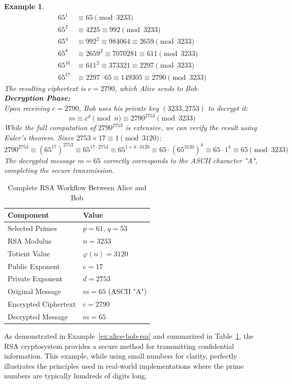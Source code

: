 \documentclass[11pt,a4paper]{article}
\newtheorem{example}{Example}
\numberwithin{equation}{section}
\begin{document}
\begin{example}
\begin{align*}
65^1 &\equiv 65 \pmod{3233} \\
65^2 &\equiv 4225 \equiv 992 \pmod{3233} \\
65^4 &\equiv 992^2 \equiv 984064 \equiv 2659 \pmod{3233} \\
65^8 &\equiv 2659^2 \equiv 7070281 \equiv 611 \pmod{3233} \\
65^{16} &\equiv 611^2 \equiv 373321 \equiv 2297 \pmod{3233} \\
65^{17} &\equiv 2297 \cdot 65 \equiv 149305 \equiv 2790 \pmod{3233}
\end{align*}
The resulting ciphertext is $c = 2790$, which Alice sends to Bob.\\
\textbf{Decryption Phase:} \\
Upon receiving $c = 2790$, Bob uses his private key $(3233, 2753)$ to decrypt it:
\[m \equiv c^d \pmod{n} \equiv 2790^{2753} \pmod{3233}\]
While the full computation of $2790^{2753}$ is extensive, we can verify the result using Euler's theorem. Since $2753 \times 17 \equiv 1 \pmod{3120}$:
\[
2790^{2753} \equiv (65^{17})^{2753} \equiv 65^{17 \cdot 2753} \equiv 65^{1 + k\cdot 3120} \equiv 65 \cdot (65^{3120})^k \equiv 65 \cdot 1^k \equiv 65 \pmod{3233}
\]
The decrypted message $m = 65$ correctly corresponds to the ASCII character "A", completing the secure transmission.
\end{example}

\begin{table}[H]
\centering
\label{tab:rsa-workflow}
\begin{tabular}{|l|l|}
\hline
\textbf{Component} & \textbf{Value} \\ \hline
Selected Primes & $p=61$, $q=53$ \\ \hline
RSA Modulus & $n=3233$ \\ \hline
Totient Value & $\varphi(n)=3120$ \\ \hline
Public Exponent & $e=17$ \\ \hline
Private Exponent & $d=2753$ \\ \hline
Original Message & $m=65$ (ASCII "A") \\ \hline
Encrypted Ciphertext & $c=2790$ \\ \hline
Decrypted Message & $m=65$ \\ \hline
\end{tabular}
\caption{Complete RSA Workflow Between Alice and Bob}
\end{table}

As demonstrated in Example~\ref{ex:alice-bob-rsa} and summarized in Table~\ref{tab:rsa-workflow}, the RSA cryptosystem provides a secure method for transmitting confidential information. This example, while using small numbers for clarity, perfectly illustrates the principles used in real-world implementations where the prime numbers are typically hundreds of digits long.
\end{document}
